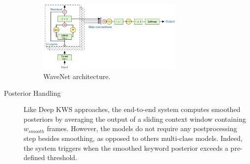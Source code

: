 \begin{description}
            \begin{figure}
                \begin{center}
                    \includegraphics[width=0.7\textwidth]{figures/wavenet_arch.png}
                    \caption{WaveNet architecture.}
                    \label{fig:wavenet_arch}
                \end{center}
            \end{figure}

            \item[Posterior Handling] Like Deep KWS approaches, the end-to-end system computes smoothed posteriors by averaging the output of a sliding context window containing $w_{smooth}$ frames. However, the models do not require any postprocessing step besides smoothing, as opposed to others multi-class models.
            Indeed, the system triggers when the smoothed keyword posterior exceeds a pre-defined threshold.
        \end{description}


